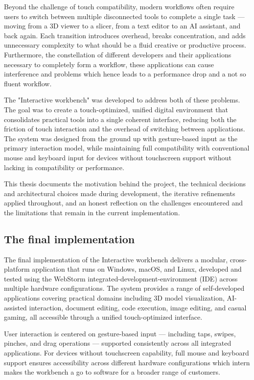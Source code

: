 \documentclass[a4paper,12pt]{article}
\begin{document}
Beyond the challenge of touch compatibility, modern workflows often require users to switch between multiple disconnected tools to complete a single task — moving from a 3D viewer to a slicer, from a text editor to an AI assistant, and back again. Each transition introduces overhead, breaks concentration, and adds unnecessary complexity to what should be a fluid creative or productive process.
Furthermore, the constellation of different developers and their applications necessary to completely form a workflow, these applications can cause interference and problems which hence leads to a performance drop and a not so fluent workflow. 

The "Interactive workbench" was developed to address both of these problems. The goal was to create a touch-optimized, unified digital environment that consolidates practical tools into a single coherent interface, reducing both the friction of touch interaction and the overhead of switching between applications. The system was designed from the ground up with gesture-based input as the primary interaction model, while maintaining full compatibility with conventional mouse and keyboard input for devices without touchscreen support without lacking in compatibility or performance.

This thesis documents the motivation behind the project, the technical decisions and architectural choices made during development, the iterative refinements applied throughout, and an honest reflection on the challenges encountered and the limitations that remain in the current implementation.

\newpage
\subsection{The final implementation}
The final implementation of the Interactive workbench delivers a modular, cross-platform application that runs on Windows, macOS, and Linux, developed and tested using the WebStorm integrated-development-environment (IDE) across multiple hardware configurations. The system provides a range of self-developed applications covering practical domains including 3D model visualization, AI-assisted interaction, document editing, code execution, image editing, and casual gaming, all accessible through a unified touch-optimized interface.

User interaction is centered on gesture-based input — including taps, swipes, pinches, and drag operations — supported consistently across all integrated applications. For devices without touchscreen capability, full mouse and keyboard support ensures accessibility across different hardware configurations which intern makes the workbench a go to software for a broader range of customers.
\end{document}
